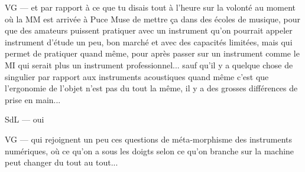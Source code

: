 VG — et par rapport à ce que tu disais tout à l'heure sur la volonté au moment où la MM est arrivée à Puce Muse de mettre ça dans des écoles de musique, pour que des amateurs puissent pratiquer avec un instrument qu'on pourrait appeler instrument d'étude un peu, bon marché et avec des capacités limitées, mais qui permet de pratiquer quand même, pour après passer sur un instrument comme le MI qui serait plus un instrument professionnel... sauf qu'il y a quelque chose de singulier par rapport aux instruments acoustiques quand même c'est que l'ergonomie de l'objet n'est pas du tout la même, il y a des grosses différences de prise en main... 

SdL — oui 

VG — qui rejoignent un peu ces questions de méta-morphisme des instruments numériques, où ce qu'on a sous les doigts selon ce qu'on branche sur la machine peut changer du tout au tout... 

